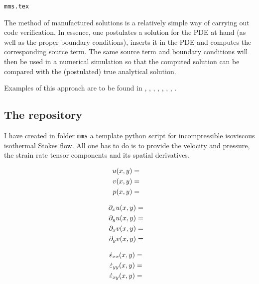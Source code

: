 \begin{flushright} {\tiny {\color{gray} \tt mms.tex}} \end{flushright}

The method of manufactured solutions is a relatively simple way of carrying out
code verification. In essence, one postulates a solution for the PDE at hand (as
well as the proper boundary conditions), inserts it in the PDE and computes the 
corresponding source term. 
The same source term and boundary conditions will then be used in a numerical 
simulation so that the computed solution can be compared with the (postulated)
true analytical solution. 

Examples of this approach are to be found in 
\textcite{dohu03}, \textcite{busa13}, \textcite{bodg06}, \textcite{polp14},
\textcite{polp14b}, \textcite{lopp14}, \textcite{blmp16}, \textcite{thba22}.

\subsection{The repository}

I have created in folder {\tt mms} a template python script for incompressible
isoviscous isothermal Stokes flow. All one has to do is to provide the velocity and 
pressure, the strain rate tensor components and its spatial derivatives.



\begin{eqnarray}
u(x,y) &=&  \nonumber\\
v(x,y) &=&  \nonumber\\
p(x,y) &=&  \nonumber
\end{eqnarray}

\begin{eqnarray}
\partial_x u (x,y)&=& \nonumber\\
\partial_y u (x,y)&=& \nonumber\\
\partial_x v (x,y)&=& \nonumber\\
\partial_y v (x,y)&=& \nonumber
\end{eqnarray}

\begin{eqnarray}
\dot\varepsilon_{xx}(x,y) &=&  \nonumber\\
\dot\varepsilon_{yy}(x,y) &=&  \nonumber\\
\dot\varepsilon_{xy}(x,y) &=&  \nonumber
\end{eqnarray}

